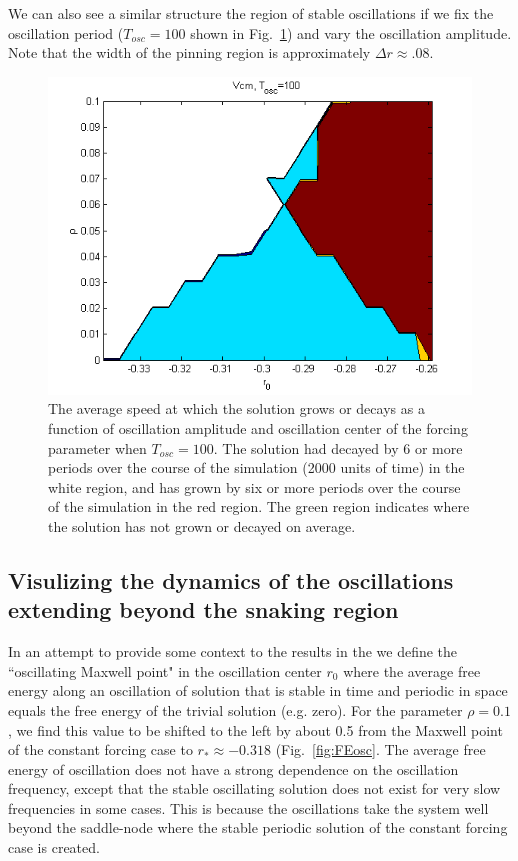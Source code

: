 \documentclass[pre,preprint,superscriptaddress]{revtex4-1}
\begin{document}
We can also see a similar structure the region of stable oscillations if we fix the oscillation period ($T_{osc} =100$ shown in Fig.~\ref{fig:Vcm100}) and vary the  oscillation amplitude.  Note that the width of the pinning region is approximately $\Delta r\approx .08$.  
\begin{figure}[!htb]\center
\includegraphics[width=120mm]{Vcm100.png}
\caption{The average speed at which the solution grows or decays as a function of oscillation amplitude and oscillation center of the forcing parameter when $T_{osc}=100$.  The solution had decayed by 6 or more periods over the course of the simulation (2000 units of time) in the white region, and has grown by six or more periods over the course of the simulation  in the red region.  The green region indicates where the solution has not grown or decayed on average.}
    \label{fig:Vcm100}
\end{figure}



\subsection{Visulizing the dynamics of the oscillations extending beyond the snaking region}
In an attempt to provide some context to the results in the we define the ``oscillating Maxwell point" in the oscillation center $r_0$ where the average free energy along an oscillation of solution that is stable in time and  periodic in space equals the free energy of the trivial solution (e.g. zero).  For the parameter $\rho=0.1$, we find this value to be shifted to the left by about 0.5 from the Maxwell point of the constant forcing case to $r_*\approx -0.318$ (Fig.~\ref{fig:FEosc}.  The average free energy of oscillation does not have a strong dependence on the oscillation frequency, except that the stable oscillating solution does not exist for very slow frequencies in some cases.  This is because the oscillations take the system well beyond the saddle-node where the stable periodic solution of the constant forcing case is created.   
\end{document}
